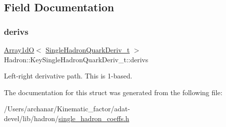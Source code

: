 \subsection{Field Documentation}
\mbox{\label{structHadron_1_1KeySingleHadronQuarkDeriv__t_a338eadc820e14621fa645cc418c1e0fb}} 
\subsubsection{\texorpdfstring{derivs}{derivs}}
{\footnotesize\ttfamily \mbox{\hyperlink{classADAT_1_1Array1dO}{Array1dO}}$<$ \mbox{\hyperlink{structHadron_1_1SingleHadronQuarkDeriv__t}{Single\+Hadron\+Quark\+Deriv\+\_\+t}} $>$ Hadron\+::\+Key\+Single\+Hadron\+Quark\+Deriv\+\_\+t\+::derivs}

Left-\/right derivative path. This is 1-\/based. 

The documentation for this struct was generated from the following file\+:\begin{DoxyCompactItemize}
\item 
/\+Users/archanar/\+Kinematic\+\_\+factor/adat-\/devel/lib/hadron/\mbox{\hyperlink{adat-devel_2lib_2hadron_2single__hadron__coeffs_8h}{single\+\_\+hadron\+\_\+coeffs.\+h}}\end{DoxyCompactItemize}
